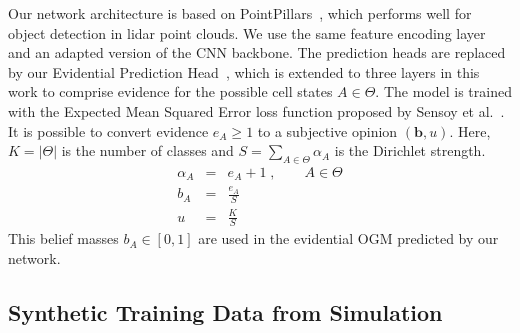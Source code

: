 \documentclass[conference]{IEEEtran}
\begin{document}
Our network architecture is based on PointPillars~\cite{Lang.2019b}, which performs well for object detection in lidar point clouds. We use the same feature encoding layer and an adapted version of the CNN backbone. The prediction heads are replaced by our Evidential Prediction Head~\cite{vanKempen.2021b}, which is extended to three layers in this work to comprise evidence for the possible cell states $A \in \Theta$. The model is trained with the Expected Mean Squared Error loss function proposed by Sensoy et al.~\cite{Sensoy.2018}. It is possible to convert evidence $e_{A} \geq 1$ to a subjective opinion $(\boldsymbol{b}, u)$. Here, $K = \left| \Theta \right|$ is the number of classes and $S = \sum_{A \in \Theta} \alpha_{A}$ is the Dirichlet strength.
\begin{eqnarray}
    \alpha_{A} & = & e_{A} + 1 \;, \qquad A \in \Theta \label{eq:evidence_to_alpha} \\
    b_A & = & \frac{e_A}{S} \\
    u & = & \frac{K}{S}
\end{eqnarray}
This belief masses $b_A \in [0,1]$ are used in the evidential OGM predicted by our network.


\subsection{Synthetic Training Data from Simulation}
\end{document}
